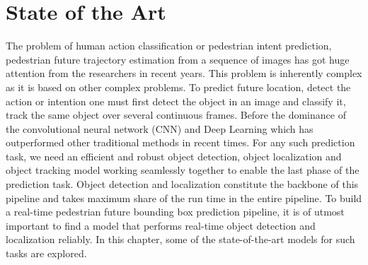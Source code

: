 \chapter{State of the Art}








The problem of human action classification or pedestrian intent prediction, pedestrian future trajectory estimation \cite{saleh2017intent, fang2018pedestrian, abu2018will, dollar2005behavior, rasouli2017agreeing, cao2017realtime} from a sequence of images has got huge attention from the researchers in recent years. This problem is inherently complex as it is based on other complex problems. To predict future location, detect the action or intention one must first detect the object in an image and classify it, track the same object over several continuous frames. Before the dominance of the convolutional neural network (CNN) and Deep Learning which has outperformed other traditional methods in recent times. For any such prediction task, we need an efficient and robust object detection, object localization and object tracking model working seamlessly together to enable the last phase of the prediction task. Object detection and localization constitute the backbone of this pipeline and takes maximum share of the run time in the entire pipeline. To build a real-time pedestrian future bounding box prediction pipeline, it is of utmost important to find a model that performs real-time object detection \cite{felzenszwalb2009object, walk2010new, liu2016ssd, szegedy2014scalable, dollar2009pedestrian, dollar2011pedestrian} and localization reliably. In this chapter, some of the state-of-the-art models for such tasks are explored.

